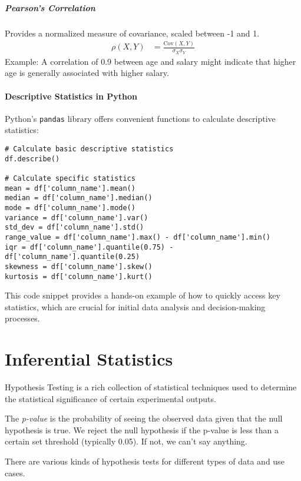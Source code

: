 \documentclass{article}
\theoremstyle{definition}
\theoremstyle{theorem}
\theoremstyle{theorem}
\theoremstyle{theorem}
\theoremstyle{theorem}
\theoremstyle{definition}
\theoremstyle{definition}
\theoremstyle{definition}
\theoremstyle{definition}
\theoremstyle{definition}
\begin{document}
\subsubsection*{Pearson's Correlation}
Provides a normalized measure of covariance, scaled between -1 and 1.
\begin{align*}
    \rho(X, Y) &= \frac{\text{Cov}(X, Y)}{\sigma_X \sigma_Y}
\end{align*}
Example: A correlation of 0.9 between age and salary might indicate that higher age is generally associated with higher salary.

\subsection{Descriptive Statistics in Python}

Python's \texttt{pandas} library offers convenient functions to calculate descriptive statistics:

\begin{verbatim}
# Calculate basic descriptive statistics
df.describe()

# Calculate specific statistics
mean = df['column_name'].mean()
median = df['column_name'].median()
mode = df['column_name'].mode()
variance = df['column_name'].var()
std_dev = df['column_name'].std()
range_value = df['column_name'].max() - df['column_name'].min()
iqr = df['column_name'].quantile(0.75) - df['column_name'].quantile(0.25)
skewness = df['column_name'].skew()
kurtosis = df['column_name'].kurt()
\end{verbatim}

This code snippet provides a hands-on example of how to quickly access key statistics, which are crucial for initial data analysis and decision-making processes.

\part{Inferential Statistics}
Hypothesis Testing is a rich collection of statistical techniques used to determine the statistical significance of certain experimental outputs.

The \textit{p-value} is the probability of seeing the observed data given that the null hypothesis is true. We reject the null hypothesis if the p-value is less than a certain set threshold (typically 0.05). If not, we can't say anything.

There are various kinds of hypothesis tests for different types of data and use cases.
\end{document}

